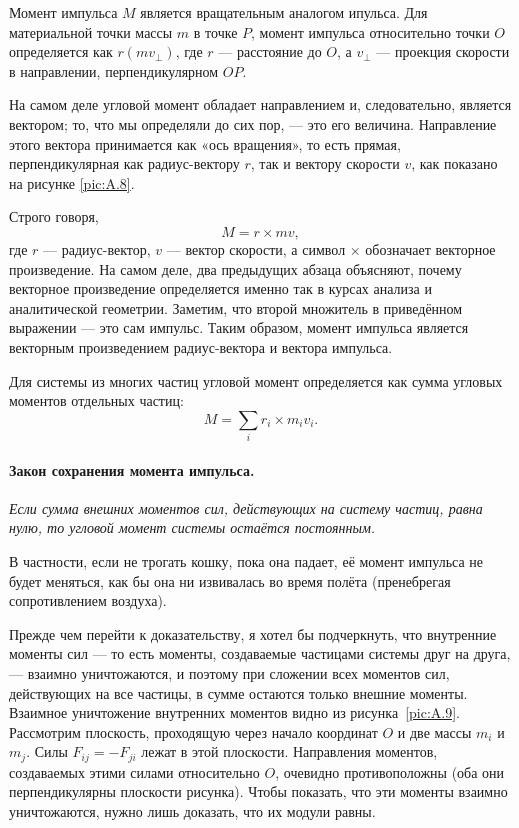 Момент импульса $M$ является вращательным аналогом
ипульса.
Для материальной точки массы $m$ в точке $P$, момент импульса относительно точки $O$ определяется как $r (m v_{\perp})$, где $r$ — расстояние до $O$, а $v_{\perp}$ — проекция скорости
в направлении, перпендикулярном $OP$.

На самом деле угловой момент обладает направлением и, следовательно, является вектором; то, что мы определяли до сих пор, — это его величина. Направление этого вектора принимается как «ось вращения», то есть прямая, перпендикулярная как радиус-вектору $r$, так и вектору скорости $v$, как показано на рисунке \ref{pic:A.8}.

Строго говоря,
\[M = r \times m v,\]
где $r$ — радиус-вектор, $v$ — вектор скорости, а символ $\times$ обозначает векторное произведение.
На самом деле, два предыдущих абзаца объясняют, почему векторное произведение определяется именно так в курсах анализа и аналитической геометрии.
Заметим, что второй множитель в приведённом выражении — это сам импульс.
Таким образом, момент импульса является векторным произведением радиус-вектора и вектора импульса.

Для системы из многих частиц угловой момент определяется как сумма угловых моментов отдельных частиц:
\begin{equation}
M = \sum_i r_i \times m_i v_i.
\label{eq:A.16}
\end{equation}

\paragraph{Закон сохранения момента импульса.}\label{Закон сохранения момента импульса}
\emph{Если сумма внешних моментов сил, действующих на систему частиц, равна нулю, то угловой момент системы остаётся постоянным.}

В частности, если не трогать кошку, пока она падает, её момент импульса не будет меняться, как бы она ни извивалась во время полёта (пренебрегая сопротивлением воздуха).

Прежде чем перейти к доказательству, я хотел бы подчеркнуть, что
внутренние моменты сил — то есть моменты, создаваемые частицами системы друг на друга, — взаимно уничтожаются,
и поэтому при сложении всех моментов сил, действующих на все частицы, в сумме остаются только внешние моменты.
Взаимное уничтожение внутренних моментов видно из рисунка~\ref{pic:A.9}.
Рассмотрим плоскость, проходящую через начало координат $O$ и две массы $m_i$ и $m_j$.
Силы $F_{ij} = -F_{ji}$ лежат в этой плоскости.
Направления моментов, создаваемых этими силами относительно $O$, очевидно противоположны
(оба они перпендикулярны плоскости рисунка).
Чтобы показать, что эти моменты взаимно уничтожаются, нужно лишь доказать, что их модули равны.

